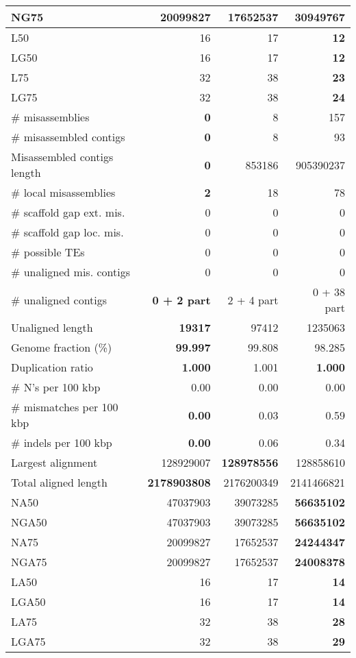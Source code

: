 \documentclass[12pt,a4paper]{article}
\begin{document}
\begin{table}[ht]
\begin{center}
\begin{tabular}{|l*{3}{|r}|}
NG75 & 20099827 & 17652537 & {\bf 30949767} \\ \hline
L50 & 16 & 17 & {\bf 12} \\ \hline
LG50 & 16 & 17 & {\bf 12} \\ \hline
L75 & 32 & 38 & {\bf 23} \\ \hline
LG75 & 32 & 38 & {\bf 24} \\ \hline
\# misassemblies & {\bf 0} & 8 & 157 \\ \hline
\# misassembled contigs & {\bf 0} & 8 & 93 \\ \hline
Misassembled contigs length & {\bf 0} & 853186 & 905390237 \\ \hline
\# local misassemblies & {\bf 2} & 18 & 78 \\ \hline
\# scaffold gap ext. mis. & 0 & 0 & 0 \\ \hline
\# scaffold gap loc. mis. & 0 & 0 & 0 \\ \hline
\# possible TEs & 0 & 0 & 0 \\ \hline
\# unaligned mis. contigs & 0 & 0 & 0 \\ \hline
\# unaligned contigs & {\bf 0 + 2 part} & 2 + 4 part & 0 + 38 part \\ \hline
Unaligned length & {\bf 19317} & 97412 & 1235063 \\ \hline
Genome fraction (\%) & {\bf 99.997} & 99.808 & 98.285 \\ \hline
Duplication ratio & {\bf 1.000} & 1.001 & {\bf 1.000} \\ \hline
\# N's per 100 kbp & 0.00 & 0.00 & 0.00 \\ \hline
\# mismatches per 100 kbp & {\bf 0.00} & 0.03 & 0.59 \\ \hline
\# indels per 100 kbp & {\bf 0.00} & 0.06 & 0.34 \\ \hline
Largest alignment & 128929007 & {\bf 128978556} & 128858610 \\ \hline
Total aligned length & {\bf 2178903808} & 2176200349 & 2141466821 \\ \hline
NA50 & 47037903 & 39073285 & {\bf 56635102} \\ \hline
NGA50 & 47037903 & 39073285 & {\bf 56635102} \\ \hline
NA75 & 20099827 & 17652537 & {\bf 24244347} \\ \hline
NGA75 & 20099827 & 17652537 & {\bf 24008378} \\ \hline
LA50 & 16 & 17 & {\bf 14} \\ \hline
LGA50 & 16 & 17 & {\bf 14} \\ \hline
LA75 & 32 & 38 & {\bf 28} \\ \hline
LGA75 & 32 & 38 & {\bf 29} \\ \hline
\end{tabular}
\end{center}
\end{table}
\end{document}
